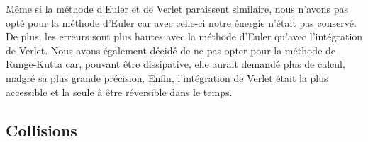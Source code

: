         Même si la méthode d'Euler et de Verlet paraissent similaire, nous n'avons pas opté pour la méthode d'Euler car avec celle-ci notre énergie n'était pas conservé. De plus, les erreurs sont plus hautes avec la méthode d'Euler qu'avec l'intégration de Verlet. Nous avons également décidé de ne pas opter pour la méthode de Runge-Kutta car, pouvant être dissipative, elle aurait demandé plus de calcul, malgré sa plus grande précision. Enfin, l'intégration de Verlet était la plus accessible et la seule à être réversible dans le temps\cite{crivelli_stormer-verlet_2008}.
    \subsection{Collisions}

